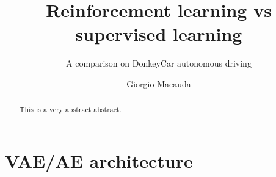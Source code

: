 \documentclass[mscthesis]{usiinfthesis}
\title{Reinforcement learning vs supervised learning} %
\subtitle{A comparison on DonkeyCar autonomous driving} %
\author{Giorgio Macauda} %
\begin{document}
\maketitle %

\frontmatter %

\begin{abstract}
This is a very abstract abstract. 
\lipsum
\end{abstract}
\begin{acknowledgements}
\lipsum 
\end{acknowledgements}


\tableofcontents 
\listoffigures %
\listoftables %

\mainmatter









\appendix %

\chapter{VAE/AE architecture} \label{app:ae/vae}
\begin{center}
    \begin{minipage}{0.9\linewidth}
      
      \end{minipage}
\end{center}
\begin{center}
    \begin{minipage}{0.9\linewidth}
      
      \end{minipage}
\end{center}

\backmatter


%
%



\end{document}
